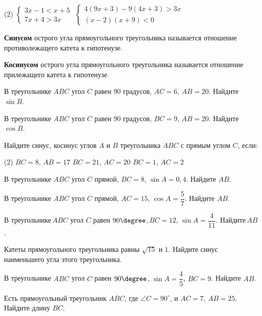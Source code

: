 \begin{class}[number=6]
	\begin{listofex}
		\item \begin{tasks}(2)
			\task 
				\( \begin{cases}
					3x-1<x+5
					\\
					7x+4>3x
				\end{cases} \)
			\task \( \begin{cases}
				4(9x+3)-9(4x+3)>3x
				\\
				(x-2)(x+9)<0
			\end{cases} \)
		\end{tasks}
		\end{listofex}
		\begin{definit}
		\textbf{Синусом} острого угла прямоугольного треугольника называется отношение противолежащего катета к гипотенузе.
		\end{definit}
		\begin{definit}
		\textbf{Косинусом} острого угла прямоугольного треугольника называется отношение прилежащего катета к гипотенузе.
		\end{definit}
		\begin{listofex}[resume]
		\item В треугольнике \( ABC \) угол \( C \) равен \( 90 \) градусов, \( AC=6 \), \( AB=20 \). Найдите \( \sin B \).
		\item  В треугольнике \( ABC \) угол \( C \) равен \( 90 \) градусов, \( BC=9 \), \( AB=20 \). Найдите \( \cos B \).
		\item Найдите синус, косинус углов \( A \) и \( B \) треугольника \( ABC \) с прямым углом \( C \), если:
		\begin{tasks}(2)
			\task \( BC=8 \), \( AB=17 \)
			\task \( BC=21 \), \( AC=20 \)
			\task \( BC=1 \), \( AC=2 \)
		\end{tasks}
		\item В треугольнике \( ABC \) угол \( C \) прямой, \( BC=8 \), \( \sin A=0,4 \). Найдите \( AB \).
		\item В треугольнике \( ABC \) угол \( C \) прямой, \( AC=15 \), \( \cos A=\dfrac{5}{7} \). Найдите \( AB \).
		\item В треугольнике \( ABC \) угол \( C \) равен \( 90\degree \), \( BC=12 \), \( \sin A=\dfrac{4}{11} \). Найдите \( AB \).
		\item Катеты прямоугольного треугольника равны \( \sqrt{15} \) и \( 1 \). Найдите синус наименьшего угла этого треугольника.
		\item В треугольнике \( ABC \) угол \( C \) равен \( 90\degree \), \( \sin A=\dfrac{4}{5} \), \( BC=9 \). Найдите \( AB \).
		\item  Есть прямоугольный треугольник \( ABC \), где \( \angle C=90^{\circ} \), и \( AC=7 \), \( AB=25 \). Найдите длину \( BC \).
	\end{listofex}
\end{class}


